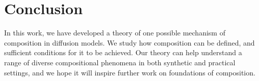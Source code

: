 \section{Conclusion} 

In this work, we have developed a theory of
one possible mechanism of composition in diffusion models.
We study how composition can be defined, and sufficient conditions
for it to be achieved.
Our theory can help understand a range of diverse
compositional phenomena in both synthetic and practical settings,
and we hope it will inspire further work on foundations of
composition.
